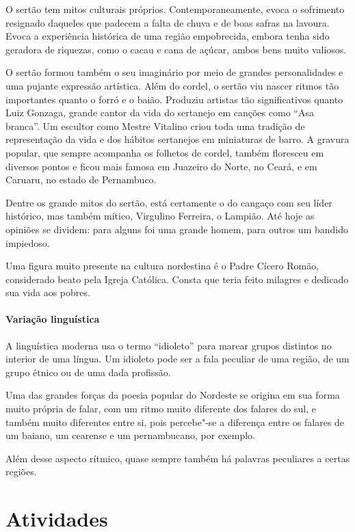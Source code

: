 \documentclass[11pt]{extarticle}
\begin{document}
O sertão tem mitos culturais próprios. Contemporaneamente, evoca o sofrimento resignado daqueles que padecem a falta de chuva e
de boas safras na lavoura. Evoca a experiência histórica de uma região
empobrecida, embora tenha sido geradora de riquezas, como o cacau e cana de
açúcar, ambos bens muito valiosos. 

O sertão formou também o seu imaginário por meio de grandes personalidades e
uma pujante expressão artística. Além do cordel, o sertão viu nascer ritmos tão
importantes quanto o forró e o baião. Produziu artistas tão significativos quanto
Luiz Gonzaga, grande cantor da vida do sertanejo em canções como “Asa branca”.
Um escultor como Mestre Vitalino criou toda uma tradição de representação da
vida e dos hábitos sertanejos em miniaturas de barro. A gravura popular, que
sempre acompanha os folhetos de cordel, também floresceu em diversos pontos e
ficou mais famosa em Juazeiro do Norte, no Ceará, e em Caruaru, no estado de
Pernambuco. 

Dentre os grande mitos do sertão, está certamente o do cangaço com seu líder
histórico, mas também mítico, Virgulino Ferreira, o Lampião. Até hoje as
opiniões se dividem: para alguns foi uma grande homem, para outros um bandido
impiedoso. 

Uma figura muito presente na cultura nordestina é o Padre Cícero Romão,
considerado beato pela Igreja Católica. Consta que teria feito milagres e
dedicado sua vida aos pobres. 

\paragraph{Variação linguística}

A linguística moderna usa o termo “idioleto” para marcar grupos distintos no
interior de uma língua. Um idioleto pode ser a fala peculiar de uma região, de
um grupo étnico ou de uma dada profissão. 

Uma das grandes forças da poesia popular do Nordeste se origina em sua forma
muito própria de falar, com um ritmo muito diferente dos falares do sul, e
também muito diferentes entre si, pois percebe"-se a diferença entre os falares
de um baiano, um cearense e um pernambucano, por exemplo.

Além desse aspecto rítmico, quase sempre também há palavras peculiares a certas
regiões. 


\section{Atividades}
\end{document}
